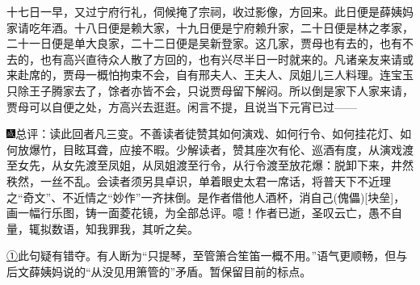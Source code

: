 十七日一早，又过宁府行礼，伺候掩了宗祠，收过影像，方回来。此日便是薛姨妈家请吃年酒。十八日便是赖大家，十九日便是宁府赖升家，二十日便是林之孝家，二十一日便是单大良家，二十二日便是吴新登家。这几家，贾母也有去的，也有不去的，也有高兴直待众人散了方回的，也有兴尽半日一时就来的。凡诸亲友来请或来赴席的，贾母一概怕拘束不会，自有邢夫人、王夫人、凤姐儿三人料理。连宝玉只除王子腾家去了，馀者亦皆不会，只说贾母留下解闷。所以倒是家下人家来请，贾母可以自便之处，方高兴去逛逛。闲言不提，且说当下元宵已过------

{\includegraphics[width=3mm]{../Images/00005}总评：读此回者凡三变。不善读者徒赞其如何演戏、如何行令、如何挂花灯、如何放爆竹，目眩耳聋，应接不暇。少解读者，赞其座次有伦、巡酒有度，从演戏渡至女先，从女先渡至凤姐，从凤姐渡至行令，从行令渡至放花爆：脱卸下来，井然秩然，一丝不乱。会读者须另具卓识，单着眼史太君一席话，将普天下不近理之``奇文''、不近情之``妙作''一齐抹倒。是作者借他人酒杯，消自己{{(傀儡)}}{[}块垒{]}，画一幅行乐图，铸一面菱花镜，为全部总评。噫！作者已逝，圣叹云亡，愚不自量，辄拟数语，知我罪我，其听之矣。}

{\href{../Text/part0058_split_000.html\#navto_1_a}{①}此句疑有错夺。有人断为``只提琴，至管箫合笙笛一概不用。''语气更顺畅，但与后文薛姨妈说的``从没见用箫管的''矛盾。暂保留目前的标点。}
